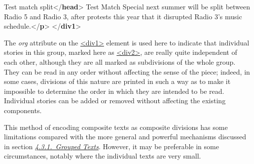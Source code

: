 \begin{shaded}
\hspace*{1em}Test match split{</\textbf{head}>}\mbox{}\newline 
\hspace*{1em}Test Match Special next summer will be split\mbox{}\newline 
\hspace*{1em}\hspace*{1em}\hspace*{1em}\hspace*{1em} between Radio 5 and Radio 3, after protests this\mbox{}\newline 
\hspace*{1em}\hspace*{1em}\hspace*{1em}\hspace*{1em} year that it disrupted Radio 3's music schedule.{</\textbf{p}>}\mbox{}\newline 
{}\mbox{}\newline 
{</\textbf{div1}>}\end{shaded}\egroup\par \noindent  \par
The {\itshape org} attribute on the \hyperref[TEI.div1]{<div1>} element is used here to indicate that individual stories in this group, marked here as \hyperref[TEI.div2]{<div2>}, are really quite independent of each other, although they are all marked as subdivisions of the whole group. They can be read in any order without affecting the sense of the piece; indeed, in some cases, divisions of this nature are printed in such a way as to make it impossible to determine the order in which they are intended to be read. Individual stories can be added or removed without affecting the existing components.\par
This method of encoding composite texts as composite divisions has some limitations compared with the more general and powerful mechanisms discussed in section \textit{\hyperref[DSGRP]{4.3.1.\ Grouped Texts}}. However, it may be preferable in some circumstances, notably where the individual texts are very small.

